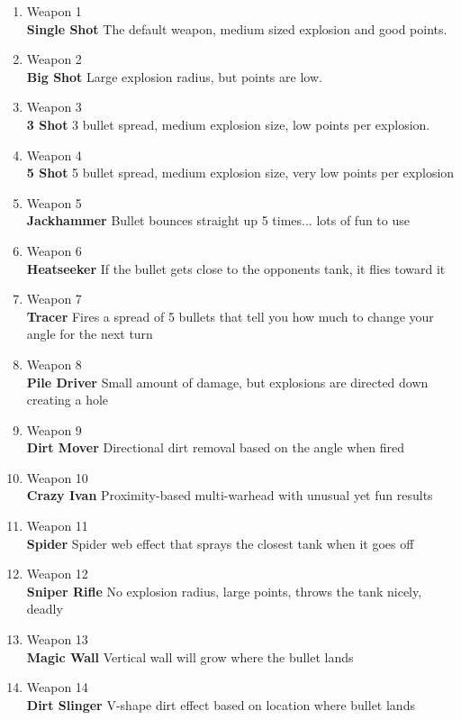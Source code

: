 \documentclass[12pt]{extarticle}
\begin{document}
\begin{enumerate}
\item Weapon 1 \\
\textbf{Single Shot} 	
The default weapon, medium sized explosion and good points.
\item Weapon 2 \\
\textbf{Big Shot} 	
Large explosion radius, but points are low.
\item Weapon 3 \\
\textbf{3 Shot} 	
3 bullet spread, medium explosion size, low points per explosion.
\item Weapon 4 \\
\textbf{5 Shot} 	
5 bullet spread, medium explosion size, very low points per explosion
\item Weapon 5 \\
\textbf{Jackhammer} 	
Bullet bounces straight up 5 times... lots of fun to use
\item Weapon 6 \\
\textbf{Heatseeker} 	
If the bullet gets close to the opponents tank, it flies toward it
\item Weapon 7 \\
\textbf{Tracer} 		
Fires a spread of 5 bullets that tell you how much to change your angle for the next turn
\item Weapon 8 \\
\textbf{Pile Driver} 	
Small amount of damage, but explosions are directed down creating a hole
\item Weapon 9 \\
\textbf{Dirt Mover} 	
Directional dirt removal based on the angle when fired
\item Weapon 10 \\
\textbf{Crazy Ivan} 	
Proximity-based multi-warhead with unusual yet fun results
\item Weapon 11 \\
\textbf{Spider} 	
Spider web effect that sprays the closest tank when it goes off
\item Weapon 12 \\
\textbf{Sniper Rifle} 	
No explosion radius, large points, throws the tank nicely, deadly
\item Weapon 13 \\
\textbf{Magic Wall} 	
Vertical wall will grow where the bullet lands
\item Weapon 14 \\
\textbf{Dirt Slinger} 	
V-shape dirt effect based on location where bullet lands

\end{enumerate}
\end{document}
